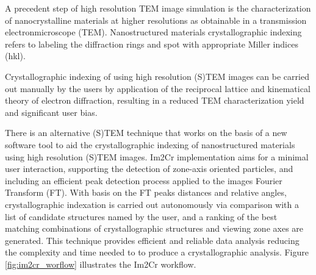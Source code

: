 \documentclass[
  oneside,
  11pt, a4paper,
  footinclude=true,
  headinclude=true,
  cleardoublepage=empty
]{scrbook}
\begin{document}
	A precedent step of high resolution TEM image simulation is the characterization of nanocrystalline materials at higher resolutions as obtainable in a transmission electronmicroscope (TEM). Nanostructured materials crystallographic indexing refers to labeling the diffraction rings and spot with appropriate Miller indices (hkl).\par 
	 Crystallographic indexing of  using high resolution (S)TEM images
	 can be carried out manually by the users by application of the reciprocal lattice and kinematical theory of electron diffraction, resulting in a reduced TEM characterization yield and significant user bias.\par 
	 There is an alternative (S)TEM technique that works on the basis of a new software tool to aid the crystallographic indexing of nanostructured materials using high resolution (S)TEM images. Im2Cr \citep{asilva2016} implementation aims for a minimal user interaction, supporting the detection of zone-axis oriented particles, and including an efficient peak detection process applied to the images Fourier Transform (FT). With basis on the FT peaks distances and relative angles, crystallographic indexation is carried out autonomously via comparison with a list of candidate structures named by the user, and a ranking of the best matching combinations of crystallographic structures and viewing zone axes are generated. This technique provides efficient and reliable data analysis reducing the complexity and time needed to to produce a crystallographic analysis. Figure \ref{fig:im2cr_worflow} illustrates the Im2Cr workflow. 
\end{document}
